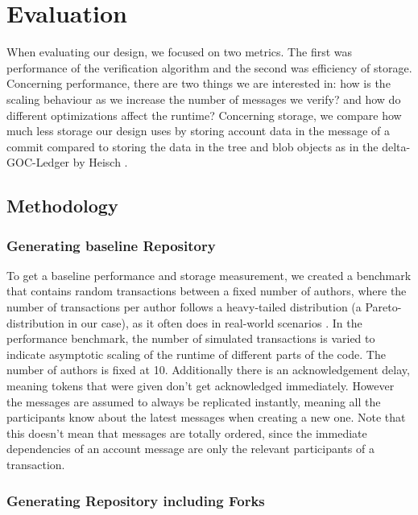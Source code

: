 \documentclass{article}
\begin{document}
\section{Evaluation}
When evaluating our design, we focused on two metrics. The first was performance of the verification algorithm and the second was efficiency of storage.
Concerning performance, there are two things we are interested in: how is the scaling behaviour as we increase the number of messages we verify? and how do different optimizations affect the runtime?
Concerning storage, we compare how much less storage our design uses by storing account data in the message of a commit compared to storing the data in the tree and blob objects as in the delta-GOC-Ledger by Heisch \cite{delta-goc-ledger-heisch}.

\subsection{Methodology}
\subsubsection{Generating baseline Repository}
\label{sec:base-repo}
To get a baseline performance and storage measurement, we created a benchmark that contains random transactions between a fixed number of authors, where the number of transactions per author follows a heavy-tailed distribution (a Pareto-distribution in our case), as it often does in real-world scenarios \cite{bitcoin-distribution-transactions}. In the performance benchmark, the number of simulated transactions is varied to indicate asymptotic scaling of the runtime of different parts of the code. The number of authors is fixed at 10. Additionally there is an acknowledgement delay, meaning tokens that were given don't get acknowledged immediately. However the messages are assumed to always be replicated instantly, meaning all the participants know about the latest messages when creating a new one. Note that this doesn't mean that messages are totally ordered, since the immediate dependencies of an account message are only the relevant participants of a transaction.

\subsubsection{Generating Repository including Forks}
\end{document}
